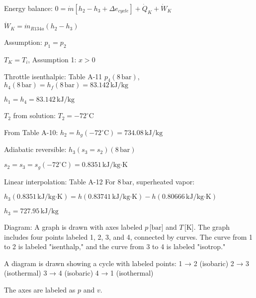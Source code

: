 Energy balance:  
\( 0 = \dot{m} \left[ h_2 - h_3 + \Delta e_{cycle} \right] + \dot{Q}_{K} + \dot{W}_{K} \)  

\( \dot{W}_{K} = \dot{m}_{R134a} \left( h_2 - h_3 \right) \)  

Assumption: \( p_1 = p_2 \)  

\( T_{K} = T_i \), Assumption 1: \( x > 0 \)  

Throttle isenthalpic: Table A-11  
\( p_4 (8 \, \text{bar}) \), \( h_4 (8 \, \text{bar}) = h_f (8 \, \text{bar}) = 83.142 \, \text{kJ/kg} \)  

\( h_1 = h_4 = 83.142 \, \text{kJ/kg} \)  

\( T_2 \) from solution:  
\( T_2 = -72^\circ \text{C} \)  

From Table A-10:  
\( h_2 = h_g (-72^\circ \text{C}) = 734.08 \, \text{kJ/kg} \)  

Adiabatic reversible:  
\( h_3 (s_3 = s_2) (8 \, \text{bar}) \)  

\( s_2 = s_3 = s_g (-72^\circ \text{C}) = 0.8351 \, \text{kJ/kg·K} \)  

Linear interpolation: Table A-12  
For \( 8 \, \text{bar} \), superheated vapor:  

\( h_3 (0.8351 \, \text{kJ/kg·K}) = h \left( 0.83741 \, \text{kJ/kg·K} \right) - h \left( 0.80666 \, \text{kJ/kg·K} \right) \)  

\( h_3 = 727.95 \, \text{kJ/kg} \)  

Diagram:  
A graph is drawn with axes labeled \( p \, \text{[bar]} \) and \( T \, \text{[K]} \).  
The graph includes four points labeled 1, 2, 3, and 4, connected by curves.  
The curve from 1 to 2 is labeled "isenthalp," and the curve from 3 to 4 is labeled "isotrop."

A diagram is drawn showing a cycle with labeled points:  
1 → 2 (isobaric)  
2 → 3 (isothermal)  
3 → 4 (isobaric)  
4 → 1 (isothermal)  

The axes are labeled as \( p \) and \( v \).